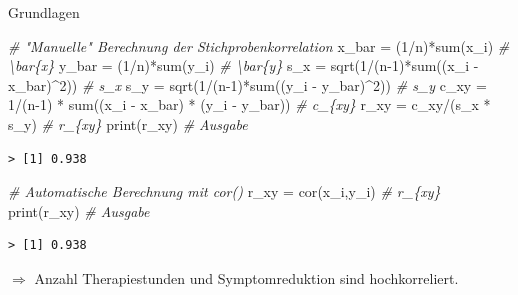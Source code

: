 \documentclass[
  8pt,
  ignorenonframetext,
]{beamer}
\newenvironment{Shaded}{\begin{snugshade}}{\end{snugshade}}
\newcommand{\CommentTok}[1]{\textcolor[rgb]{0.56,0.35,0.01}{\textit{#1}}}
\newcommand{\DecValTok}[1]{\textcolor[rgb]{0.00,0.00,0.81}{#1}}
\newcommand{\FunctionTok}[1]{\textcolor[rgb]{0.00,0.00,0.00}{#1}}
\newcommand{\NormalTok}[1]{#1}
\newcommand{\OtherTok}[1]{\textcolor[rgb]{0.56,0.35,0.01}{#1}}
\newcommand{\SpecialCharTok}[1]{\textcolor[rgb]{0.00,0.00,0.00}{#1}}
\begin{document}
\begin{frame}[fragile]{Grundlagen}
\begin{Shaded}
\begin{Highlighting}[]
\CommentTok{\# "Manuelle" Berechnung der Stichprobenkorrelation}
\NormalTok{x\_bar }\OtherTok{=}\NormalTok{ (}\DecValTok{1}\SpecialCharTok{/}\NormalTok{n)}\SpecialCharTok{*}\FunctionTok{sum}\NormalTok{(x\_i)                                                           }\CommentTok{\# \textbackslash{}bar\{x\}}
\NormalTok{y\_bar }\OtherTok{=}\NormalTok{ (}\DecValTok{1}\SpecialCharTok{/}\NormalTok{n)}\SpecialCharTok{*}\FunctionTok{sum}\NormalTok{(y\_i)                                                           }\CommentTok{\# \textbackslash{}bar\{y\}}
\NormalTok{s\_x   }\OtherTok{=} \FunctionTok{sqrt}\NormalTok{(}\DecValTok{1}\SpecialCharTok{/}\NormalTok{(n}\DecValTok{{-}1}\NormalTok{)}\SpecialCharTok{*}\FunctionTok{sum}\NormalTok{((x\_i }\SpecialCharTok{{-}}\NormalTok{ x\_bar)}\SpecialCharTok{\^{}}\DecValTok{2}\NormalTok{))                                       }\CommentTok{\# s\_x}
\NormalTok{s\_y   }\OtherTok{=} \FunctionTok{sqrt}\NormalTok{(}\DecValTok{1}\SpecialCharTok{/}\NormalTok{(n}\DecValTok{{-}1}\NormalTok{)}\SpecialCharTok{*}\FunctionTok{sum}\NormalTok{((y\_i }\SpecialCharTok{{-}}\NormalTok{ y\_bar)}\SpecialCharTok{\^{}}\DecValTok{2}\NormalTok{))                                       }\CommentTok{\# s\_y }
\NormalTok{c\_xy  }\OtherTok{=} \DecValTok{1}\SpecialCharTok{/}\NormalTok{(n}\DecValTok{{-}1}\NormalTok{) }\SpecialCharTok{*} \FunctionTok{sum}\NormalTok{((x\_i }\SpecialCharTok{{-}}\NormalTok{ x\_bar) }\SpecialCharTok{*}\NormalTok{ (y\_i }\SpecialCharTok{{-}}\NormalTok{ y\_bar))                             }\CommentTok{\# c\_\{xy\}}
\NormalTok{r\_xy  }\OtherTok{=}\NormalTok{ c\_xy}\SpecialCharTok{/}\NormalTok{(s\_x }\SpecialCharTok{*}\NormalTok{ s\_y)                                                         }\CommentTok{\# r\_\{xy\}}
\FunctionTok{print}\NormalTok{(r\_xy)                                                                      }\CommentTok{\# Ausgabe}
\end{Highlighting}
\end{Shaded}

\begin{verbatim}
> [1] 0.938
\end{verbatim}

\begin{Shaded}
\begin{Highlighting}[]
\CommentTok{\# Automatische Berechnung mit cor()}
\NormalTok{r\_xy  }\OtherTok{=} \FunctionTok{cor}\NormalTok{(x\_i,y\_i)                                                             }\CommentTok{\# r\_\{xy\}}
\FunctionTok{print}\NormalTok{(r\_xy)                                                                      }\CommentTok{\# Ausgabe}
\end{Highlighting}
\end{Shaded}

\begin{verbatim}
> [1] 0.938
\end{verbatim}

\center

\(\Rightarrow\) Anzahl Therapiestunden und Symptomreduktion sind
hochkorreliert.
\end{frame}
\end{document}
